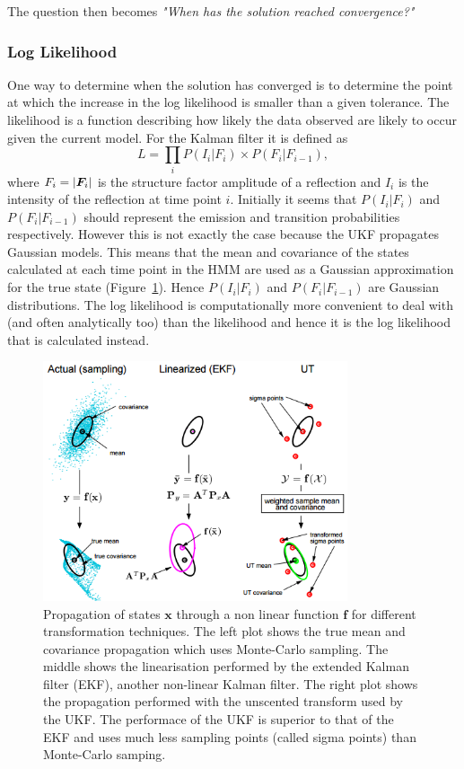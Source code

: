 The question then becomes \textit{"When has the solution reached convergence?"}

\subsubsection{Log Likelihood}
\label{subs:Log Likelihood}
One way to determine when the solution has converged is to determine the point at which the increase in the log likelihood is smaller than a given tolerance.
The likelihood is a function describing how likely the data observed are likely to occur given the current model.
For the Kalman filter it is defined as \cite{cressie2015statistics}
\begin{equation}
    L = \prod_i P(I_i | F_i) \times P( F_i | F_{i-1}),
\end{equation}
where $F_i = |\boldsymbol{F}_i|$ is the structure factor amplitude of a reflection and $I_i$ is the intensity of the reflection at time point $i$.
Initially it seems that $P(I_i | F_i)$ and $P( F_i | F_{i-1})$ should represent the emission and transition probabilities respectively.
However this is not exactly the case because the UKF propagates Gaussian models.
This means that the mean and covariance of the states calculated at each time point in the HMM are used as a Gaussian approximation for the true state (Figure~\ref{fig:State propagation for different filters}).
Hence $P(I_i | F_i)$ and $P( F_i | F_{i-1})$ are Gaussian distributions.
The log likelihood is computationally more convenient to deal with (and often analytically too) than the likelihood and hence it is the log likelihood that is calculated instead.
\begin{figure}[ht!]
    \centering
    \includegraphics[width=0.8\textwidth]{figures/datared/StateTransformation.png}
    \caption{Propagation of states $\mathbf{x}$ through a non linear function $\mathbf{f}$ for different transformation techniques.
    The left plot shows the true mean and covariance propagation which uses Monte-Carlo sampling.
    The middle shows the linearisation performed by the extended Kalman filter (EKF), another non-linear Kalman filter.
    The right plot shows the propagation performed with the unscented transform used by the UKF.
    The performace of the UKF is superior to that of the EKF and uses much less sampling points (called sigma points) than Monte-Carlo samping.}
    \label{fig:State propagation for different filters}
\end{figure}

